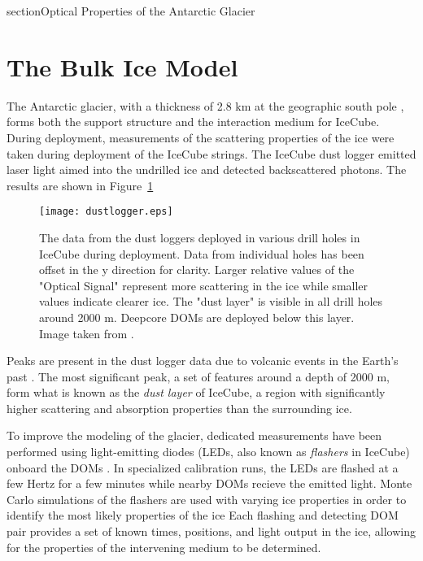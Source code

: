 section{Optical Properties of the Antarctic Glacier}

\label{sec:bulk_ice}
\section{The Bulk Ice Model}
The Antarctic glacier, with a thickness of 2.8 km at the geographic south pole \cite{IceCube-SpiceMie}, forms both the support structure and the interaction medium for IceCube.
During deployment, measurements of the scattering properties of the ice were taken during deployment of the IceCube strings.
The IceCube dust logger emitted laser light aimed into the undrilled ice and detected backscattered photons\cite{IceCube-DustLogger1, IceCube-DustLogger2}.
The results are shown in Figure~\ref{fig:dust_logger}

\begin{figure}[h]
\texttt{[image: dustlogger.eps]} 
\caption{The data from the dust loggers deployed in various drill holes in IceCube during deployment. Data from individual holes has been offset in the y direction for clarity. Larger relative values of the "Optical Signal" represent more scattering in the ice while smaller values indicate clearer ice. The "dust layer" is visible in all drill holes around 2000 m. Deepcore DOMs are deployed below this layer. Image taken from \cite{IceCube-DustLogger-Raw}.}
\label{fig:dust_logger}
\end{figure}

Peaks are present in the dust logger data due to volcanic events in the Earth's past \cite{IceCube-DustLogger1,}.
The most significant peak, a set of features around a depth of 2000 m, form what is known as the \emph{dust layer} of IceCube, a region with significantly higher scattering and absorption properties than the surrounding ice.

To improve the modeling of the glacier, dedicated measurements have been performed using light-emitting diodes (LEDs, also known as \emph{flashers} in IceCube) onboard the DOMs \cite{IceCube-SpiceMie, Description-IceCube}.
In specialized calibration runs, the LEDs are flashed at a few Hertz for a few minutes while nearby DOMs recieve the emitted light.
Monte Carlo simulations of the flashers are used with varying ice properties in order to identify the most likely properties of the ice
Each flashing and detecting DOM pair provides a set of known times, positions, and light output in the ice, allowing for the properties of the intervening medium to be determined.


